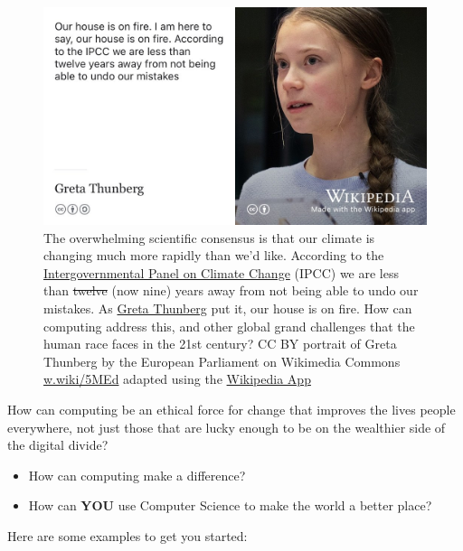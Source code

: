 \documentclass[
]{book}
\providecommand{\tightlist}{%
  \setlength{\itemsep}{0pt}\setlength{\parskip}{0pt}}
\begin{document}
\begin{figure}

{\centering \includegraphics[width=1\linewidth]{images/greta-thunberg} 

}

\caption{The overwhelming scientific consensus is that our climate is changing much more rapidly than we'd like. According to the \href{Intergovernmental\%20Panel\%20on\%20Climate\%20Change}{Intergovernmental Panel on Climate Change} (IPCC) we are less than \sout{twelve} (now nine) years away from not being able to undo our mistakes. As \href{https://en.wikipedia.org/wiki/Greta_Thunberg}{Greta Thunberg} put it, our house is on fire. \citep{gretathunberg} How can computing address this, and other global grand challenges that the human race faces in the 21st century? CC BY portrait of Greta Thunberg by the European Parliament on Wikimedia Commons \href{https://w.wiki/5MEd}{w.wiki/5MEd} adapted using the \href{https://apps.apple.com/gb/app/wikipedia/id324715238}{Wikipedia App}}\label{fig:greta-fig}
\end{figure}



How can computing be an ethical force for change that improves the lives people everywhere, not just those that are lucky enough to be on the wealthier side of the digital divide?

\begin{itemize}
\tightlist
\item
  How can computing make a difference?
\item
  How can \textbf{YOU} use Computer Science to make the world a better place?
\end{itemize}

Here are some examples to get you started:
\end{document}
